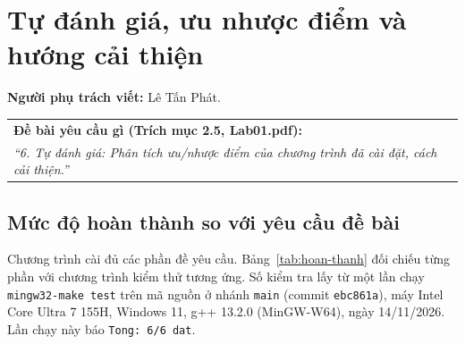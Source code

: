\section{Tự đánh giá, ưu nhược điểm và hướng cải thiện}
\label{sec:tu-danh-gia}

\noindent\textbf{Người phụ trách viết:} Lê Tấn Phát.

\begin{table}[h!]
\centering
\begin{tabular}{|p{14.5cm}|}
\hline
\textbf{Đề bài yêu cầu gì (Trích mục 2.5, Lab01.pdf):} \\
\textit{``6. Tự đánh giá: Phân tích ưu/nhược điểm của chương trình đã cài đặt, cách cải thiện.''} \\
\hline
\end{tabular}
\end{table}


\subsection{Mức độ hoàn thành so với yêu cầu đề bài}

Chương trình cài đủ các phần đề yêu cầu. Bảng~\ref{tab:hoan-thanh} đối chiếu từng phần với chương trình kiểm thử tương ứng. Số kiểm tra lấy từ một lần chạy \texttt{mingw32-make test} trên mã nguồn ở nhánh \texttt{main} (commit \texttt{ebc861a}), máy Intel Core Ultra 7 155H, Windows 11, g++ 13.2.0 (MinGW-W64), ngày 14/11/2026. Lần chạy này báo \texttt{Tong: 6/6 dat}.

